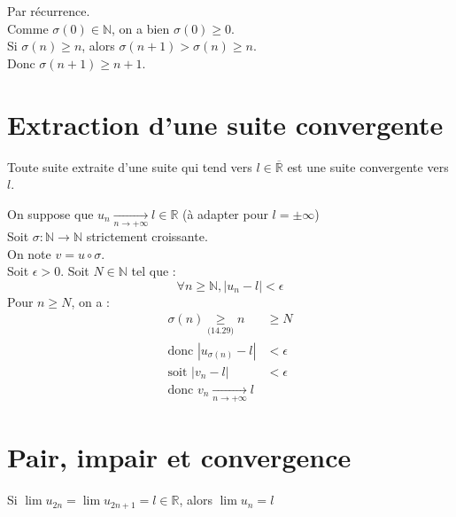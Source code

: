 \documentclass[../main.tex]{subfiles}
\begin{document}
Par récurrence. \\
Comme $\sigma(0) \in \mathbb{N}$, on a bien $\sigma(0) \geq 0$. \\
Si $\sigma(n) \geq n$, alors $\sigma(n+1) > \sigma(n) \geq n$. \\
Donc $\sigma(n+1) \geq n+1$. 

\section{Extraction d'une suite convergente}
\begin{tcolorbox}[title=Propostion 14.30, title filled=false, colframe=lightblue, colback=lightblue!10!white]
    Toute suite extraite d'une suite qui tend vers $l \in \overline{\mathbb{R}}$ est une suite convergente vers $l$. 
\end{tcolorbox}

On suppose que $u_n \underset{n \to +\infty}{\longrightarrow}  l \in \mathbb{R}$ (à adapter pour $l = \pm\infty$) \\
Soit $\sigma : \mathbb{N} \to \mathbb{N}$ strictement croissante. \\
On note $v = u \circ \sigma$. \\
Soit $\epsilon > 0$. Soit $N \in \mathbb{N}$ tel que : 
$$\forall n \geq \mathbb{N}, |u_n - l| < \epsilon$$
Pour $n \geq N$, on a : 
\begin{align*}
    \sigma(n) \underset{\text{(14.29)}}{\geq} n &\geq N \\
    \text{donc } |u_{\sigma(n)} - l| &< \epsilon \\
    \text{soit } |v_n - l| &< \epsilon \\
    \text{donc } \boxed{v_n \underset{n \to +\infty}{\longrightarrow} l}
\end{align*}

\setcounter{section}{31}
\section{Pair, impair et convergence}
\begin{tcolorbox}[title=Propostion 14.32, title filled=false, colframe=lightblue, colback=lightblue!10!white]
    Si $\lim u_{2n} = \lim u_{2n+1} = l \in \mathbb{R}$, alors $\lim u_n = l$
\end{tcolorbox}
\end{document}

